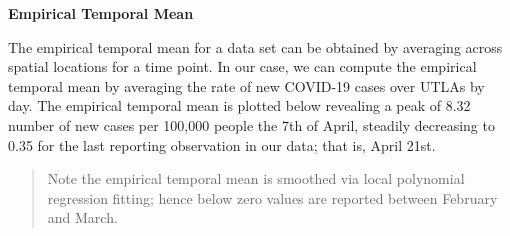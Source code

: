 \documentclass[
]{book}
\begin{document}
\textbf{Empirical Temporal Mean}

The empirical temporal mean for a data set can be obtained by averaging across spatial locations for a time point. In our case, we can compute the empirical temporal mean by averaging the rate of new COVID-19 cases over UTLAs by day. The empirical temporal mean is plotted below revealing a peak of 8.32 number of new cases per 100,000 people the 7th of April, steadily decreasing to 0.35 for the last reporting observation in our data; that is, April 21st.

\begin{quote}
Note the empirical temporal mean is smoothed via local polynomial regression fitting; hence below zero values are reported between February and March.
\end{quote}
\end{document}
